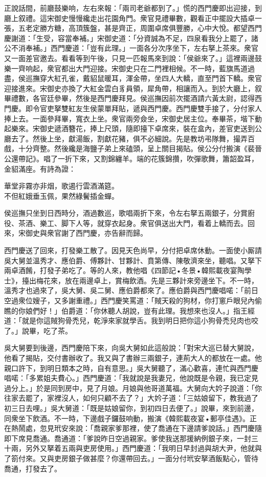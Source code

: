 正說話間，前廳鼓樂响，左右來報：「兩司老爺都到了。」慌的西門慶即出迎接，到廳上叙禮。這宋御史慢慢纔走出花園角門。衆官見禮畢數，觀看正中擺設大插卓一張，五老定勝方糖，高頂簇盤，甚是齊正，周圍卓席俱豐勝，心中大悅。都望西門慶謝道：「生受，容當奉補。」宋御史道：「分資誠為不足，四泉看我分上罷了，諸公不消奉補。」西門慶道：「豈有此理。」一面各分次序坐下，左右拏上茶來。衆官又一面差官邀去。看看等到午後，只見一匹報馬來到說：「侯爺來了。」這裡兩邊鼓樂一齊响起，衆官都出大門迎接。宋御史只在二門裡相候。不一時，藍旗馬道過盡，侯巡撫穿大紅孔雀，戴貂鼠暖耳，渾金帶，坐四人大轎，直至門首下轎。衆官迎接進來。宋御史亦換了大紅金雲白豸員領，犀角帶，相讓而入。到於大廳上，叙畢禮數，各官廷參畢，然後是西門慶拜見。侯巡撫因前次擺酒請六黃太尉，認得西門慶。即令官吏拏雙紅友生侯蒙單拜貼，遞與西門慶。西門慶雙手接了，分付家人捧上去。一面參拜畢，寬衣上坐。衆官兩旁僉坐，宋御史居主位。奉畢茶，堦下動起樂來。宋御史遞酒簪花，捧上尺頭，隨即擡下卓席來，裝在盒內，差官吏送到公廳去了。然後上坐，獻湯飯，割獻花豬，俱不必細說。先是教坊弔隊舞，撮弄百戲，十分齊整。然後纔是海鹽子弟上來磕頭，呈上關目揭貼。侯公分付搬演《裴晉公還帶記》。唱了一折下來，又割錦纏羊。端的花簇錦攢，吹彈歌舞，簫韶盈耳，金貂滿座。{}有詩為證：

\begin{myquote} 
華堂非霧亦非烟，歌遏行雲酒滿筵。\\不但紅娥垂玉佩，果然綠鬢插金蟬。
\end{myquote} 

侯巡撫只坐到日西時分，酒過數巡，歌唱兩折下來，令左右拏五兩銀子，分賞廚役、茶酒、樂工、脚下人等，就穿衣起身。衆官俱送出大門，看着上轎而去。回來，宋御史與衆官謝了西門慶，亦告辭而歸。

西門慶送了回來，打發樂工散了。因見天色尚早，分付把卓席休動。一面使小厮請吳大舅並溫秀才、應伯爵、傅夥計、甘夥計、賁第傳、陳敬濟來坐，聽唱。又拏下兩卓酒餚，打發子弟吃了。等的人來，教他唱《四節記•冬景•韓熙載夜宴陶學士》，擡出梅花來，放在兩邊卓上，賞梅飲酒。先是三夥計來旁邊坐下。不一時，溫秀才也過來了，吳大舅、吳二舅、應伯爵都來了。應伯爵與西門慶唱喏：「前日空過衆位嫂子，又多謝重禮。」西門慶笑罵道：「賊天殺的狗材，你打窻戶眼兒內偷瞧的你娘們好！」{}伯爵道：「你休聽人胡說，豈有此理。我想來也沒人。」{}指王經道：「就是你這賊狗骨禿兒，乾淨來家就學舌。我到明日把你這小狗骨禿兒肉也咬了。」說畢，吃了茶。

吳大舅要到後邊，西門慶陪下來，向吳大舅如此這般說：「對宋大巡已替大舅說，他看了揭貼，交付書辦收了。我又與了書辦三兩銀子，連荊大人的都放在一處。他親口許下，到明日類本之時，自有意思。」吳大舅聽了，滿心歡喜，連忙與西門慶唱喏：「多累姐夫費心。」西門慶道：「我就說是我妻兄，他說既是令親，我已定見過分上。」於是同到房中，見了月娘。月娘與他哥道萬福。大舅向大妗子說道：「你往家去罷了，家裡沒人，如何只顧不去了？」大妗子道：「三姑娘留下，教我過了初三日去哩。」吳大舅道：「既是姑娘留你，到初四日去便了。」說畢，來到前邊，同衆坐下飲酒。不一時，下邊戲子鑼鼓响動，搬演《韓熙載夜宴•郵亭佳遇》。正在熱鬧處，忽見玳安來說：「喬親家爹那裡，使了喬通在下邊請爹說話。」西門慶隨即下席見喬通。喬通道：「爹說昨日空過親家。爹使我送那援納例銀子來，一封三十兩，另外又拏着五兩與吏房使用。」西門慶道：「我明日早封過與胡大尹，他就與了箚付來。又與吏房銀子做甚麼？你還帶回去。」一面分付玳安拏酒飯點心，管待喬通，打發去了。

